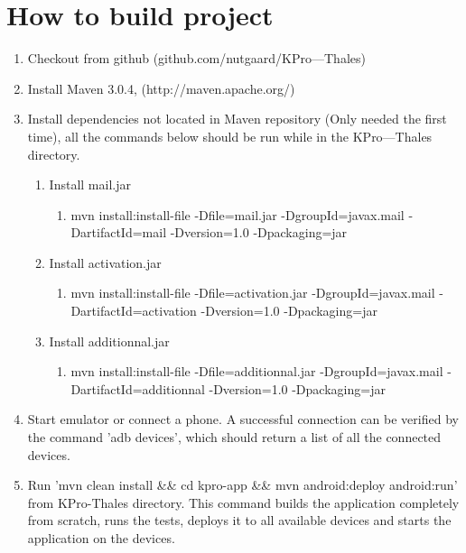 \chapter{How to build project}

\begin{enumerate}
\item{}Checkout from github (github.com/nutgaard/KPro---Thales)
\item{}Install Maven 3.0.4, (http://maven.apache.org/)
\item{}Install dependencies not located in Maven repository (Only needed the first time), all the commands below should be run while in the KPro---Thales directory.
\begin{enumerate}
\item{}Install mail.jar
\begin{enumerate}
\item{}mvn install:install-file -Dfile=mail.jar -DgroupId=javax.mail -DartifactId=mail -Dversion=1.0 -Dpackaging=jar
\end{enumerate}
\item{}Install activation.jar
\begin{enumerate}
\item{}mvn install:install-file -Dfile=activation.jar -DgroupId=javax.mail -DartifactId=activation -Dversion=1.0 -Dpackaging=jar
\end{enumerate}	
\item{}Install additionnal.jar
\begin{enumerate}
\item{}mvn install:install-file -Dfile=additionnal.jar -DgroupId=javax.mail -DartifactId=additionnal -Dversion=1.0 -Dpackaging=jar
\end{enumerate}
\end{enumerate}
\item{}Start emulator or connect a phone. A successful connection can be verified by the command 'adb devices', which should return a list of all the connected devices. 
\item{}Run 'mvn clean install \&\& cd kpro-app \&\& mvn android:deploy android:run' from KPro-Thales directory.
This command builds the application completely from scratch, runs the tests, deploys it to all available devices and starts the application on the devices.
\end{enumerate}